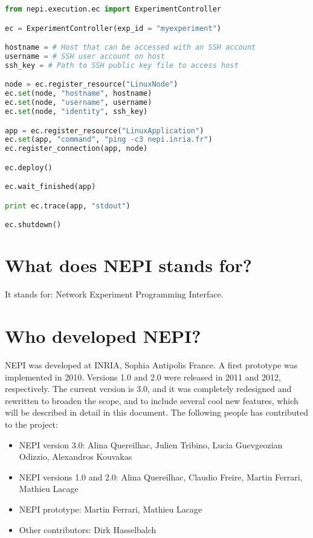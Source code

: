 \begin{lstlisting}[language=Python]
from nepi.execution.ec import ExperimentController

ec = ExperimentController(exp_id = "myexperiment")

hostname = # Host that can be accessed with an SSH account
username = # SSH user account on host
ssh_key = # Path to SSH public key file to access host

node = ec.register_resource("LinuxNode")
ec.set(node, "hostname", hostname)
ec.set(node, "username", username)
ec.set(node, "identity", ssh_key)

app = ec.register_resource("LinuxApplication")
ec.set(app, "command", "ping -c3 nepi.inria.fr")
ec.register_connection(app, node)

ec.deploy()

ec.wait_finished(app)

print ec.trace(app, "stdout")

ec.shutdown()

\end{lstlisting}

\section{What does NEPI stands for?}

It stands for: Network Experiment Programming Interface.

\section{Who developed NEPI?}

NEPI was developed at INRIA, Sophia Antipolis France.
A first prototype was implemented in 2010. 
Versions 1.0 and 2.0 were released in 2011 and 2012, respectively. 
The current version is 3.0, and it was completely redesigned and
rewritten to broaden the scope, and to include several cool 
new features, which will be described in detail in this document.
The following people has contributed to the project:

\begin{itemize}
  \item NEPI version 3.0: Alina Quereilhac, Julien Tribino, Lucia Guevgeozian Odizzio, Alexandros Kouvakas
  \item NEPI versions 1.0 and 2.0: Alina Quereilhac, Claudio Freire, Martin Ferrari, Mathieu Lacage
  \item NEPI prototype: Martin Ferrari, Mathieu Lacage
  \item Other contributors: Dirk Hasselbalch
\end{itemize}

